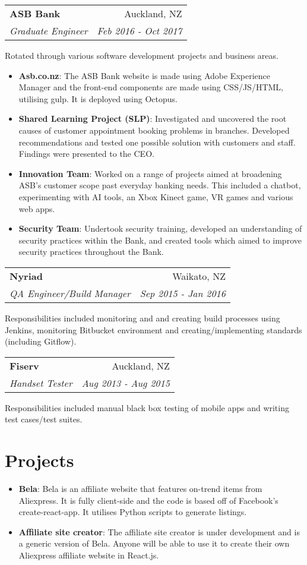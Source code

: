 \documentclass[letterpaper,10pt]{article}
\makeatletter
\newcommand{\resumeItem}[2]{
  \item\small{
    \textbf{#1}{: #2 \vspace{-2pt}}
  }
}
\newcommand{\resumeSubheading}[4]{
  \vspace{-1pt}\item
    \begin{tabular*}{0.97\textwidth}{l@{\extracolsep{\fill}}r}
      \textbf{#1} & #2 \\
      \textit{\small#3} & \textit{\small #4} \\
    \end{tabular*}\vspace{-2pt}
}
\newcommand{\resumeSubItem}[2]{\resumeItem{#1}{#2}\vspace{1pt}}
\newcommand{\resumeSubHeadingListStart}{\begin{itemize}[leftmargin=*]}
\newcommand{\resumeSubHeadingListEnd}{\end{itemize}}
\newcommand{\resumeItemListStart}{\begin{itemize} \vspace{-3pt}}
\newcommand{\resumeItemListEnd}{\end{itemize} \vspace{-1pt}}
\makeatother
\begin{document}
      \resumeSubheading
      {ASB Bank}{Auckland, NZ}
      {Graduate Engineer}{Feb 2016 - Oct 2017}
      \par{Rotated through various software development projects and business areas.}
      \resumeItemListStart
        \resumeItem{Asb.co.nz}
          {The ASB Bank website is made using Adobe Experience Manager and the front-end components are made using CSS/JS/HTML, utilising gulp. It is deployed using Octopus. }
        \resumeItem{Shared Learning Project (SLP)}
          {Investigated and uncovered the root causes of customer appointment booking problems in branches. Developed recommendations and tested one possible solution with customers and staff. Findings were presented to the CEO. }
          \resumeItem{Innovation Team}
          {Worked on a range of projects aimed at broadening ASB’s customer scope past everyday banking needs. This included a chatbot, experimenting with AI tools, an Xbox Kinect game, VR games and various web apps.}
          \resumeItem{Security Team}
          {Undertook security training, developed an understanding of security practices within the Bank, and created tools which aimed to improve security practices throughout the Bank.}
      \resumeItemListEnd
      
    \resumeSubheading
      {Nyriad}{Waikato, NZ}
      {QA Engineer/Build Manager}{Sep 2015 - Jan 2016}
      \par{Responsibilities included monitoring and and creating build processes using Jenkins, monitoring Bitbucket environment and creating/implementing standards (including Gitflow). }

    \resumeSubheading
      {Fiserv}{Auckland, NZ}
      {Handset Tester}{Aug 2013 - Aug 2015}
      \par{Responsibilities included manual black box testing of mobile apps and writing test cases/test suites.}


\section{Projects}
  \resumeSubHeadingListStart
    \resumeSubItem{Bela}
      {Bela is an affiliate website that features on-trend items from Aliexpress. It is fully client-side and the code is based off of Facebook's create-react-app. It utilises Python scripts to generate listings.}
    \resumeSubItem{Affiliate site creator}
      {The affiliate site creator is under development and is a generic version of Bela. Anyone will be able to use it to create their own Aliexpress affiliate website in React.js. }
  \resumeSubHeadingListEnd
\end{document}
